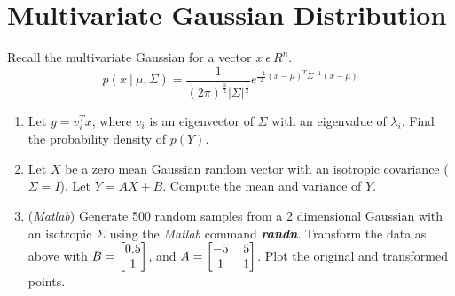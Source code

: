 \documentclass[12pt]{article}
\numberwithin{equation}{section}
\numberwithin{table}{section}
\numberwithin{figure}{section}
\begin{document}
\section{Multivariate Gaussian Distribution}
Recall the multivariate Gaussian for a vector $x\ \epsilon\ R^n$.
\begin{equation}\label{eq:4.1}
	p(x\ |\ \mu, \Sigma) = \frac{1}{(2\pi)^\frac{n}{2}|\Sigma|^\frac{1}{2}} e^{\frac{-1}{2}(x - \mu)^T\Sigma^{-1}(x - \mu)} 
\end{equation}

\begin{enumerate}[label=(\alph*)]
	\item Let $y=v_i^Tx$, where $v_i$ is an eigenvector of $\Sigma$ with an eigenvalue of $\lambda_i$. Find the probability density of $p(Y)$.
	
	\item Let $X$ be a zero mean Gaussian random vector with an isotropic covariance ($\Sigma  = I$). Let $Y = AX + B$. Compute the mean and variance of $Y$.
	
	\item (\textit{Matlab}) Generate 500 random samples from a 2 dimensional Gaussian with an isotropic $\Sigma$ using the \textit{Matlab} command \textit{\textbf{randn}}. Transform the data as above with
	$
	B = 
	\renewcommand\arraystretch{1}
	\setlength\arraycolsep{6pt}
	\begin{bmatrix}
	0.5 \\
	1 \\
	\end{bmatrix}
	$, and $
	A = 
	\renewcommand\arraystretch{1}
	\setlength\arraycolsep{6pt}
	\begin{bmatrix}
	-5 & 5 \\
	1 & 1 \\
	\end{bmatrix}
	$. Plot the original and transformed points.
	
\end{enumerate}
\end{document}
